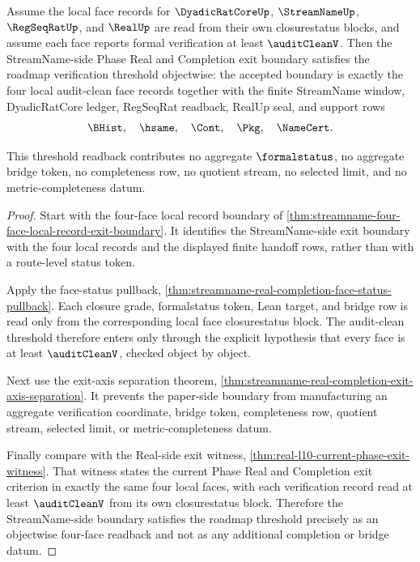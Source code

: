 \begin{theorem}
\label{thm:streamname-four-face-audit-clean-threshold-readback}
Assume the local face records for $\DyadicRatCoreUp$, $\StreamNameUp$, $\RegSeqRatUp$, and $\RealUp$ are read from their own closurestatus blocks, and assume each face reports formal verification at least $\auditCleanV$. Then the StreamName-side Phase Real and Completion exit boundary satisfies the roadmap verification threshold objectwise: the accepted boundary is exactly the four local audit-clean face records together with the finite StreamName window, DyadicRatCore ledger, RegSeqRat readback, RealUp seal, and support rows
$$
\BHist,\quad \hsame,\quad \Cont,\quad \Pkg,\quad \NameCert.
$$

This threshold readback contributes no aggregate $\formalstatus$, no aggregate bridge token, no completeness row, no quotient stream, no selected limit, and no metric-completeness datum.
\end{theorem}
\begin{proof}
Start with the four-face local record boundary of \autoref{thm:streamname-four-face-local-record-exit-boundary}. It identifies the StreamName-side exit boundary with the four local records and the displayed finite handoff rows, rather than with a route-level status token.

Apply the face-status pullback, \autoref{thm:streamname-real-completion-face-status-pullback}. Each closure grade, formalstatus token, Lean target, and bridge row is read only from the corresponding local face closurestatus block. The audit-clean threshold therefore enters only through the explicit hypothesis that every face is at least $\auditCleanV$, checked object by object.

Next use the exit-axis separation theorem, \autoref{thm:streamname-real-completion-exit-axis-separation}. It prevents the paper-side boundary from manufacturing an aggregate verification coordinate, bridge token, completeness row, quotient stream, selected limit, or metric-completeness datum.

Finally compare with the Real-side exit witness, \autoref{thm:real-l10-current-phase-exit-witness}. That witness states the current Phase Real and Completion exit criterion in exactly the same four local faces, with each verification record read at least $\auditCleanV$ from its own closurestatus block. Therefore the StreamName-side boundary satisfies the roadmap threshold precisely as an objectwise four-face readback and not as any additional completion or bridge datum.
\end{proof}

